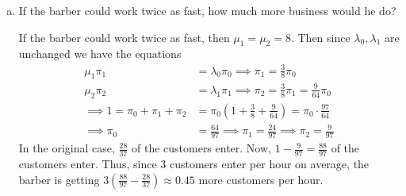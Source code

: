 \documentclass{article}
\begin{document}
\begin{itemize}
\begin{enumerate}[(a)]
			\item If the barber could work twice as fast, how much more business would he do?
				\begin{soln}
					If the barber could work twice as fast, then $\mu_1=\mu_2=8.$ Then since $\lambda_0, \lambda_1$ are unchanged we have the equations
					\begin{align*}
						\mu_1\pi_1&=\lambda_0\pi_0 \implies \pi_1 = \frac{3}{8} \pi_0 \\
						\mu_2\pi_2 &= \lambda_1\pi_1 \implies \pi_2 = \frac{3}{8}\pi_1 = \frac{9}{64} \pi_0 \\
						\implies 1=\pi_0+\pi_1+\pi_2 &= \pi_0\left( 1+\frac{3}{8} + \frac{9}{64} \right) = \pi_0\cdot \frac{97}{64} \\
						\implies \pi_0 &= \frac{64}{97} \implies \pi_1 = \frac{24}{97}\implies \pi_2 = \frac{9}{97}
					\end{align*}
					In the original case, $\frac{28}{37}$ of the customers enter. Now, $1-\frac{9}{97} = \frac{88}{97}$ of the customers enter. Thus, since 3 customers enter per hour on average, the barber is getting $3\left( \frac{88}{97} - \frac{28}{37} \right)\approx 0.45$ more customers per hour.
				\end{soln}
				
		\end{enumerate}


\end{itemize}
\end{document}
